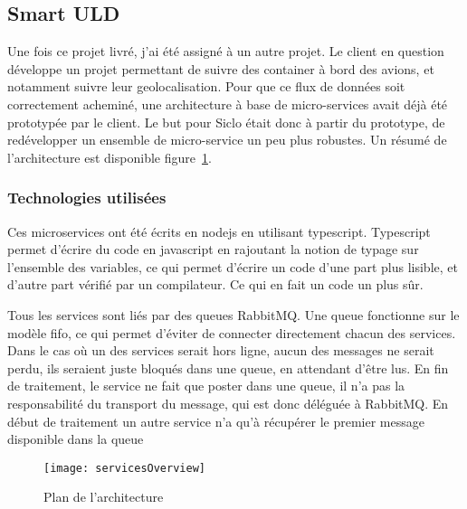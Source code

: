 \documentclass[../rapport.tex]{subfiles}
\begin{document}
        \subsection{Smart ULD}
        Une fois ce projet livré, j'ai été assigné à un autre projet.
        Le client en question développe un projet permettant de suivre des container
        à bord des avions, et notamment suivre leur geolocalisation.
        Pour que ce flux de données soit correctement acheminé, une architecture à base de micro-services
        avait déjà été prototypée par le client. Le but pour Siclo était donc à
        partir du prototype, de 
        redévelopper un ensemble de micro-service un peu plus robustes. Un
        résumé de l'architecture est disponible figure~\ref{fig:overview}.
        \subsubsection{Technologies utilisées}
            Ces microservices ont été écrits en nodejs en utilisant typescript.
            Typescript permet d'écrire du code en javascript en rajoutant la notion de
            typage sur l'ensemble des variables, ce qui permet d'écrire un code d'une part
            plus lisible, et d'autre part vérifié par un compilateur. Ce qui en fait un code un
            plus sûr.

            Tous les services sont liés par des queues RabbitMQ. Une queue
            fonctionne sur le modèle \gls{fifo}, ce qui permet
            d'éviter de connecter directement chacun des services. Dans le cas
            où un des services serait hors ligne, aucun des messages ne serait
            perdu, ils seraient juste bloqués dans une queue, en attendant
            d'être lus. En fin de traitement, le service ne fait que poster
            dans une queue, il n'a pas la responsabilité du transport du
            message, qui est donc déléguée à RabbitMQ. En début de traitement
            un autre service n'a qu'à récupérer le premier message disponible
            dans la queue

        \begin{figure}
            \centering
            \texttt{[image: servicesOverview]}
            \caption{Plan de l'architecture}\label{fig:overview}
        \end{figure}
\end{document}

